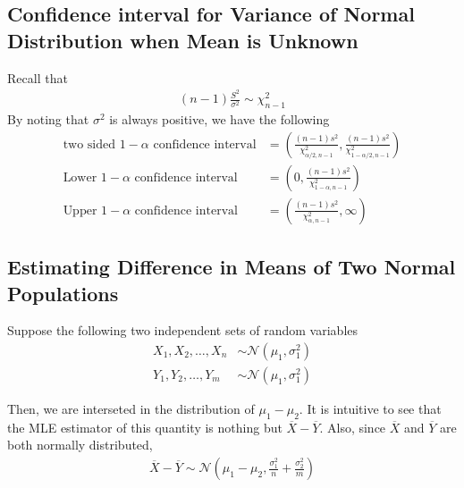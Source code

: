 \documentclass[../probability-notes.tex]{subfiles}
\begin{document}
    \subsection{Confidence interval for Variance of Normal Distribution when Mean is Unknown}
    Recall that
    \begin{align*}
        (n-1)\frac{S^{2}}{\sigma^{2}} \sim \chi_{n-1}^{2}
    \end{align*}
    By noting that $\sigma^{2}$ is always positive, we have the following
    \begin{align*}
        \text{two sided $1 - \alpha$ confidence interval} &= (\frac{(n-1)s^{2}}{\chi_{\alpha/2, n-1}^{2}}, \frac{(n-1)s^{2}}{\chi_{1 - \alpha/2, n-1}^{2}})\\
        \text{Lower $1-\alpha$ confidence interval} &= (0, \frac{(n-1)s^{2}}{\chi_{1 - \alpha, n-1}^{2}})\\
        \text{Upper $1-\alpha$ confidence interval} &= (\frac{(n-1)s^{2}}{\chi_{\alpha, n-1}^{2}}, \infty)
    \end{align*}


    \subsection{Estimating Difference in Means of Two Normal Populations}\label{mean_diff_normal}
    Suppose the following two independent sets of random variables
    \begin{align*}
        X_{1}, X_{2}, \ldots, X_{n} &\sim \mathcal{N}(\mu_{1}, \sigma_{1}^{2})\\
        Y_{1}, Y_{2}, \ldots, Y_{m} &\sim \mathcal{N}(\mu_{1}, \sigma_{1}^{2})
    \end{align*}

    Then, we are interseted in the distribution of $\mu_{1} - \mu_{2}$. It is intuitive to see that the MLE estimator of this quantity is nothing but $\overline{X} - \overline{Y}$. Also, since $\overline{X}$ and $\overline{Y}$ are both normally distributed,
    \begin{align*}
        \overline{X} - \overline{Y} \sim \mathcal{N}(\mu_{1} - \mu_{2}, \frac{\sigma_{1}^{2}}{n} + \frac{\sigma_{2}^{2}}{m})
    \end{align*}
\end{document}
